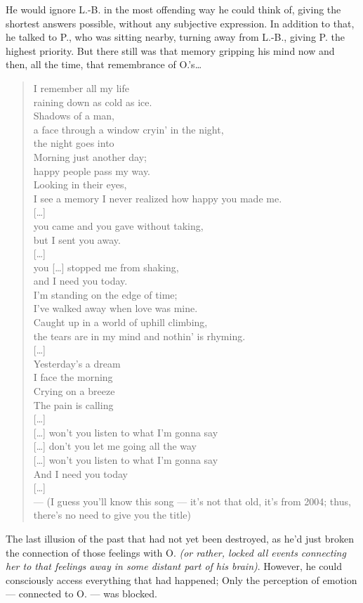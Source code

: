 He would ignore L.-B. in the most offending way he could think of, giving the shortest answers possible, without any subjective expression. 
In addition to that, he talked to P., who was sitting nearby, turning away from L.-B., giving P. the highest priority. 
But there still was that memory gripping his mind now and then, all the time, that remembrance of O.'s\dots{}
\begin{quote}
I remember all my life \\
raining down as cold as ice. \\
Shadows of a man, \\
a face through a window cryin' in the night, \\
the night goes into \\
Morning just another day; \\
happy people pass my way. \\
Looking in their eyes, \\
I see a memory I never realized how happy you made me. \\
{[\dots{}]}\\[1\baselineskip]
you came and you gave without taking, \\
but I sent you away. \\
{[\dots{}]}\\[1\baselineskip]
you {[\dots{}]} stopped me from shaking, \\
and I need you today. \\[1\baselineskip]
I'm standing on the edge of time; \\
I've walked away when love was mine. \\
Caught up in a world of uphill climbing, \\
the tears are in my mind and nothin' is rhyming. \\[1\baselineskip]
{[\dots{}]}\\[1\baselineskip]
Yesterday's a dream \\
I face the morning \\
Crying on a breeze \\
The pain is calling \\
{[\dots{}]}\\[1\baselineskip]
{[\dots{}]} won't you listen to what I'm gonna say \\
{[\dots{}]} don't you let me going all the way \\
{[\dots{}]} won't you listen to what I'm gonna say \\
And I need you today \\
{[\dots{}]}\\
--- (I guess you'll know this song --- it's not that old, it's from 2004; thus, there's no need to give you the title)
\end{quote}
The last illusion of the past that had not yet been destroyed, as he'd just broken the connection of those feelings with O. \emph{(or rather, locked all events connecting her to that feelings away in some distant part of his brain)}. However, he could consciously access everything that had happened; Only the perception of emotion --- connected to O. --- was blocked.

